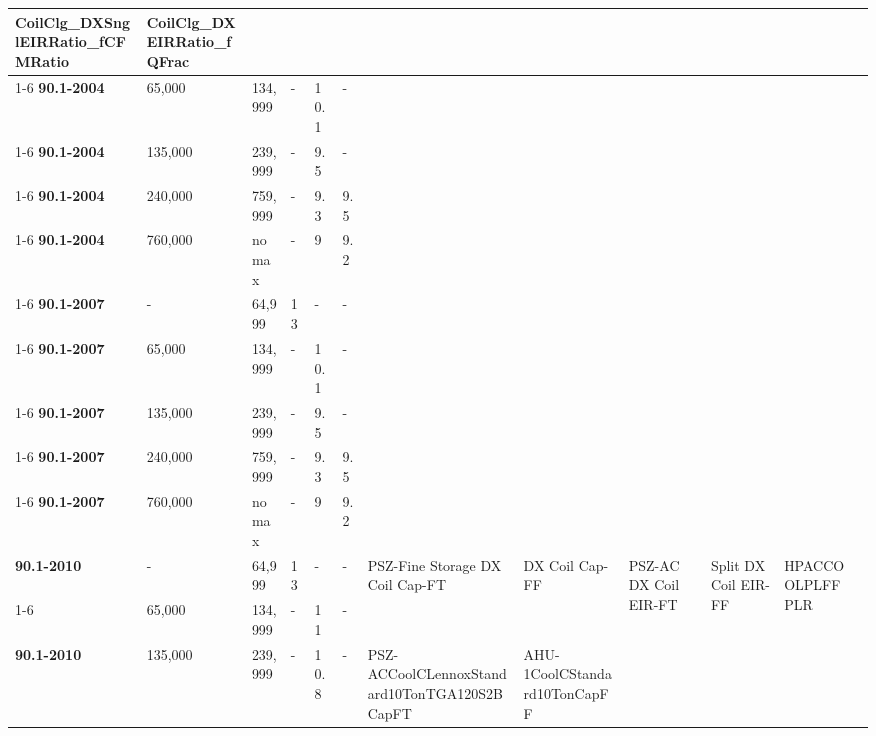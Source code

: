 \begin{table}
\begin{tabular}{|p{0.4in}|p{0.4in}|p{0.4in}|p{0.4in}|p{0.4in}|p{0.4in}|p{0.4in}|p{0.4in}|p{0.4in}|p{0.4in}|p{0.4in}|p{0.4in}|}
  \multirow{10}{*}{\parbox{0.4in}{CoilClg\_DXSnglEIRRatio\_fCFMRatio}} &
  \multirow{10}{*}{\parbox{0.4in}{CoilClg\_DXEIRRatio\_fQFrac}} \\ \cline{1-6}
\textbf{90.1-2004}         & 65,000  & 134,999   & -   & 10.1 & -   &  &  &  &  &  \\ \cline{1-6}
\textbf{90.1-2004}         & 135,000 & 239,999   & -   & 9.5  & -   &  &  &  &  &  \\ \cline{1-6}
\textbf{90.1-2004}         & 240,000 & 759,999   & -   & 9.3  & 9.5 &  &  &  &  &  \\ \cline{1-6}
\textbf{90.1-2004}         & 760,000 & no max    & -   & 9    & 9.2 &  &  &  &  &  \\ \cline{1-6}
\textbf{90.1-2007}         & -       & 64,999    & 13  & -    & -   &  &  &  &  &  \\ \cline{1-6}
\textbf{90.1-2007}         & 65,000  & 134,999   & -   & 10.1 & -   &  &  &  &  &  \\ \cline{1-6}
\textbf{90.1-2007}         & 135,000 & 239,999   & -   & 9.5  & -   &  &  &  &  &  \\ \cline{1-6}
\textbf{90.1-2007}         & 240,000 & 759,999   & -   & 9.3  & 9.5 &  &  &  &  &  \\ \cline{1-6}
\textbf{90.1-2007}         & 760,000 & no max    & -   & 9    & 9.2 &  &  &  &  &  \\ \hline
\multirow{3}{*}{\textbf{90.1-2010}} &
\multirow{3}{*}{-} &
\multirow{3}{*}{64,999} &
\multirow{3}{*}{13} &
\multirow{3}{*}{-} &
\multirow{3}{*}{-} &
\multirow{5}{*}{\parbox{0.4in}{PSZ-Fine Storage DX Coil Cap-FT}} &
\multirow{5}{*}{\parbox{0.4in}{DX Coil Cap-FF}} &
\multirow{5}{*}{\parbox{0.4in}{PSZ-AC DX Coil EIR-FT}} &
\multirow{5}{*}{\parbox{0.4in}{Split DX Coil EIR-FF}} &
\multirow{5}{*}{\parbox{0.4in}{HPA\-CCOOL\-PLFFPLR}} \\
& & & & & & & & & & \\
& & & & & & & & & & \\ \cline{1-6}
\multirow{2}{*}{\textbf{90.1-2010}} &
  \multirow{2}{*}{65,000} &
  \multirow{2}{*}{134,999} &
  \multirow{2}{*}{-} &
  \multirow{2}{*}{11} &
  \multirow{2}{*}{-} &
 & & & & \\
 & & & & & & & & & & \\ \hline
\multirow{3}{*}{\textbf{90.1-2010}} &
  \multirow{3}{*}{135,000} &
  \multirow{3}{*}{239,999} &
  \multirow{3}{*}{-} &
  \multirow{3}{*}{10.8} &
  \multirow{3}{*}{-} &
  \multirow{9}{*}{\parbox{0.4in}{PSZ-AC\-Cool\-CLennox\-Standard\-10Ton\-TGA12\-0S2B\-CapFT}} &
  \multirow{9}{*}{\parbox{0.4in}{AHU-1\-CoolC\-Standard\-10Ton\-CapFF}} &

\end{tabular}
\end{table}
